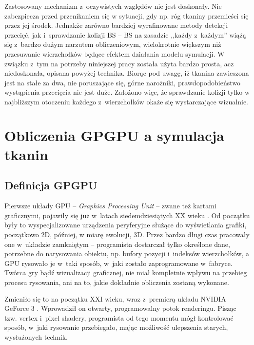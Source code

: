 				Zastosowany mechanizm z~oczywistych względów nie jest doskonały. Nie zabezpiecza przed przenikaniem się w sytuacji, gdy np. róg tkaniny przemieści się przez jej środek. Jednakże zarówno bardziej wyrafinowane metody detekcji przecięć, jak i~sprawdzanie kolizji BS -- BS na zasadzie ,,każdy z~każdym'' wiążą się z~bardzo dużym narzutem obliczeniowym, wielokrotnie większym niż przesuwanie wierzchołków będące efektem działania modelu symulacji. W związku z~tym na potrzeby niniejszej pracy została użyta bardzo prosta, acz niedoskonała, opisana powyżej technika. Biorąc pod uwagę, iż tkanina zawieszona jest na stałe za dwa, nie poruszające się, górne narożniki, prawdopodobieństwo wystąpienia przecięcia nie jest duże. Założono więc, że sprawdzanie kolizji tylko w najbliższym otoczeniu każdego z~wierzchołków okaże się wystarczające wizualnie.
			
	\section{Obliczenia GPGPU a symulacja tkanin}
	\label{t:teoria:gpu}
	
		\subsection{Definicja GPGPU}
		\label{t:teoria:gpu:gpgpu}
		
		Pierwsze układy GPU -- \emph{Graphics Processing Unit} -- zwane też kartami graficznymi, pojawiły się już w~latach siedemdziesiątych XX wieku \cite{gpu_wiki}. Od początku były to wyspecjalizowane urządzenia peryferyjne służące do wyświetlania grafiki, początkowo 2D, później, w miarę ewolucji, 3D. Przez bardzo długi czas pracowały one w~układzie zamkniętym -- programista dostarczał tylko określone dane, potrzebne do narysowania obiektu, np. bufory pozycji i~indeksów wierzchołków, a GPU rysowało je w~taki sposób, w~jaki zostało zaprogramowane w~fabryce. Twórca gry bądź wizualizacji graficznej, nie miał kompletnie wpływu na przebieg procesu rysowania, ani na to, jakie dokładnie obliczenia zostaną wykonane. 
		
		Zmieniło się to na początku XXI wieku, wraz z~premierą układu NVIDIA GeForce 3 \cite{gpu_wiki}. Wprowadził on otwarty, programowalny potok renderingu. Pisząc tzw. vertex i~pixel shadery, programista od tego momentu mógł kontrolować sposób, w~jaki rysowanie przebiegało, mając możliwość ulepszenia starych, wysłużonych technik. 
		
